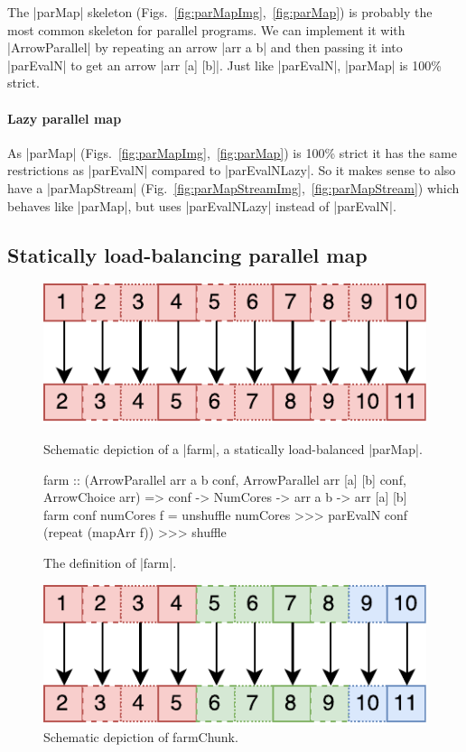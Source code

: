 The |parMap| skeleton (Figs.~\ref{fig:parMapImg},~\ref{fig:parMap}) is probably the most common skeleton for parallel programs. We can implement it with |ArrowParallel| by repeating an arrow |arr a b| and then passing it into |parEvalN| to get an arrow |arr [a] [b]|.
Just like |parEvalN|, |parMap| is 100\% strict.

\paragraph{Lazy parallel map}
As |parMap| (Figs.~\ref{fig:parMapImg},~\ref{fig:parMap}) is 100\% strict it has the same restrictions as |parEvalN| compared to |parEvalNLazy|. So it makes sense to also have a |parMapStream| (Fig.~\ref{fig:parMapStreamImg},~\ref{fig:parMapStream}) which behaves like |parMap|, but uses |parEvalNLazy| instead of |parEvalN|.

\subsection{Statically load-balancing parallel map}

\begin{figure}[h]
\includegraphics[scale=0.7]{images/farm}
\caption{Schematic depiction of a |farm|, a statically
      load-balanced |parMap|.}
\label{fig:farmImg}

\begin{code}
farm :: (ArrowParallel arr a b conf,
	ArrowParallel arr [a] [b] conf, ArrowChoice arr) =>
	conf -> NumCores -> arr a b -> arr [a] [b]
farm conf numCores f =
	unshuffle numCores >>>
	parEvalN conf (repeat (mapArr f)) >>>
	shuffle
\end{code}
\caption{The definition of |farm|.}
\label{fig:farm}

\includegraphics[scale=0.7]{images/farmChunk}
\caption{Schematic depiction of farmChunk.}
\label{fig:farmChunkImg}
\end{figure}

